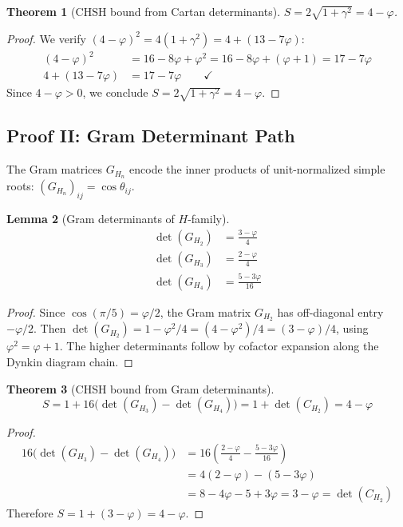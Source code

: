 \documentclass[12pt,a4paper]{article}
\newtheorem{theorem}{Theorem}
\newtheorem{lemma}[theorem]{Lemma}
\newcommand{\vp}{\varphi}
\newcommand{\detG}[1]{\det(G_{#1})}
\newcommand{\detC}[1]{\det(C_{#1})}
\begin{document}
\begin{theorem}[CHSH bound from Cartan determinants]
\label{thm:cartan_bound}
$S = 2\sqrt{1 + \gamma^2} = 4 - \vp$.
\end{theorem}

\begin{proof}
We verify $(4-\vp)^2 = 4(1+\gamma^2) = 4 + (13-7\vp)$:
\begin{align}
(4-\vp)^2 &= 16 - 8\vp + \vp^2 = 16 - 8\vp + (\vp+1) = 17 - 7\vp \\
4 + (13-7\vp) &= 17 - 7\vp \qquad\checkmark
\end{align}
Since $4-\vp > 0$, we conclude $S = 2\sqrt{1+\gamma^2} = 4-\vp$.
\end{proof}

\subsection{Proof II: Gram Determinant Path}
\label{sec:proof_gram}

The Gram matrices $G_{H_n}$ encode the inner products of unit-normalized 
simple roots: $(G_{H_n})_{ij} = \cos\theta_{ij}$.

\begin{lemma}[Gram determinants of $H$-family]
\label{lem:gram_dets}
\begin{align}
\detG{H_2} &= \frac{3-\vp}{4} \label{eq:detG2}\\
\detG{H_3} &= \frac{2-\vp}{4} \label{eq:detG3}\\
\detG{H_4} &= \frac{5-3\vp}{16} \label{eq:detG4}
\end{align}
\end{lemma}

\begin{proof}
Since $\cos(\pi/5) = \vp/2$, the Gram matrix $G_{H_2}$ has off-diagonal 
entry $-\vp/2$. Then $\detG{H_2} = 1 - \vp^2/4 = (4-\vp^2)/4 = (3-\vp)/4$, 
using $\vp^2 = \vp+1$. The higher determinants follow by cofactor expansion 
along the Dynkin diagram chain.
\end{proof}

\begin{theorem}[CHSH bound from Gram determinants]
\label{thm:gram_bound}
\begin{equation}
S = 1 + 16\bigl(\detG{H_3} - \detG{H_4}\bigr) = 1 + \detC{H_2} = 4 - \vp
\end{equation}
\end{theorem}

\begin{proof}
\begin{align}
16\bigl(\detG{H_3} - \detG{H_4}\bigr) 
&= 16\left(\frac{2-\vp}{4} - \frac{5-3\vp}{16}\right) \\
&= 4(2-\vp) - (5-3\vp) \\
&= 8 - 4\vp - 5 + 3\vp = 3 - \vp = \detC{H_2}
\end{align}
Therefore $S = 1 + (3-\vp) = 4-\vp$.
\end{proof}
\end{document}
